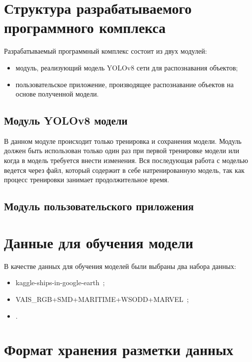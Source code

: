 
\section{Структура разрабатываемого программного комплекса}

Разрабатываемый программный комплекс состоит из двух модулей:
\begin{itemize}[label=---]
    \item модуль, реализующий модель YOLOv8 сети для распознавания объектов;
    \item пользовательское приложение, производящее распознавание объектов на основе полученной модели.
\end{itemize}

\subsection{Модуль YOLOv8 модели}

В данном модуле происходит только тренировка и сохранения модели. Модуль должен быть использован только один раз при первой тренировке модели или когда в модель требуется внести изменения. Вся последующая работа с моделью ведется через файл, который содержит в себе натренированную модель, так как процесс тренировки занимает продолжительное время.

\subsection{Модуль пользовательского приложения}

\section{Данные для обучения модели}

В качестве данных для обучения моделей были выбраны два набора данных:
\begin{itemize}[label=---]
    \item kaggle-ships-in-google-earth~\cite{kaggle-ships-in-google-earth-dfqwt_dataset};
    \item VAIS\_RGB+SMD+MARITIME+WSODD+MARVEL~\cite{vais_rgb-smd-maritime-wsodd-marvel_dataset};
    \item \cite{ship-ubxk4_dataset}.
\end{itemize}

\section{Формат хранения разметки данных}

